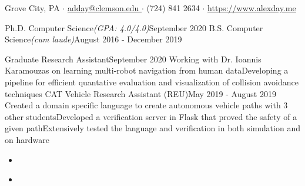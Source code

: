 \documentclass[letter]{article}
\begin{document}
        \nobibliography*
        \vspace*{-40pt}

         {Grove City, PA $\cdot$ \href{mailto://adday@clemson.edu}{\underline{adday@clemson.edu }} $\cdot$ (724) 841 2634 $\cdot$ \href{https://www.alexday.me} {\underline{https://www.alexday.me}}}

                     {Ph.D. Computer Science}{\textit{(GPA: 4.0/4.0)}}{September 2020}
		    \vspace{\interspace}
                     {B.S. Computer Science}{\textit{(cum laude)}}{August 2016 - December 2019}
		    \vspace{\interspace}
	    \vspace{-\interspace}


                    {Graduate Research Assistant}{September 2020}
                    {Working with Dr. Ioannis Karamouzas on learning multi-robot navigation from human data}{Developing a pipeline for efficient quantative evaluation and visualization of collision avoidance techniques}
		    \vspace{\interspace}
                    {CAT Vehicle Research Assistant (REU)}{May 2019 - August 2019}
                    {Created a domain specific language to create autonomous vehicle paths with 3 other students}{Developed a verification server in Flask that proved the safety of a given path}{Extensively tested the language and verification in both simulation and on hardware}
		    \vspace{\interspace}
	    \vspace{-\interspace}

            \begin{itemize}[leftmargin=0px, label={}, itemsep=\interspace, topsep=0pt]
                    \item \href{https://www.alexday.me/pdf/emoji.pdf}{}
                    \item \href{https://www.alexday.me/pdf/extractive.pdf}{}
            \end{itemize}
\end{document}
